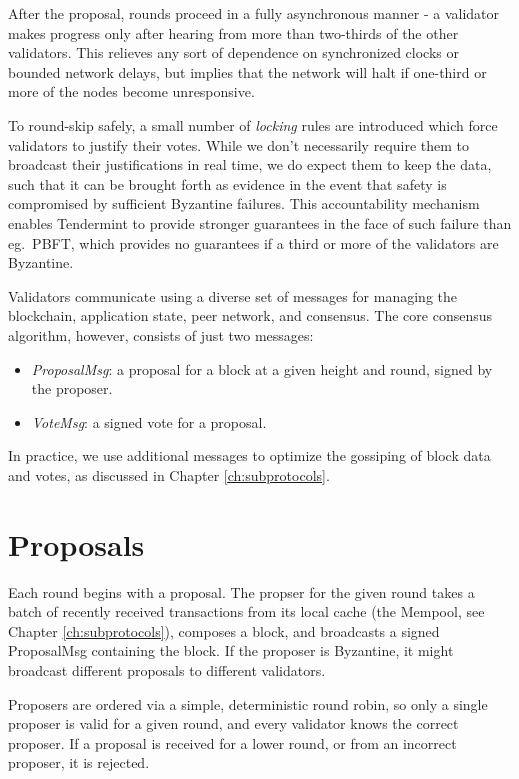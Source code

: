 After the proposal, rounds proceed in a fully asynchronous manner - a validator makes progress only after hearing from more than two-thirds of the other validators.
This relieves any sort of dependence on synchronized clocks or bounded network delays,
but implies that the network will halt if one-third or more of the nodes become unresponsive.

To round-skip safely, a small number of \emph{locking} rules are introduced which force validators to justify their votes.
While we don't necessarily require them to broadcast their justifications in real time, we do expect them to keep the data,
such that it can be brought forth as evidence in the event that safety is compromised by sufficient Byzantine failures.
This accountability mechanism enables Tendermint to provide stronger guarantees in the face of such failure than eg.~PBFT,
which provides no guarantees if a third or more of the validators are Byzantine.

Validators communicate using a diverse set of messages for managing the blockchain, application state, peer network, and consensus.
The core consensus algorithm, however, consists of just two messages:

\begin{itemize}
\item{\emph{ProposalMsg}: a proposal for a block at a given height and round, signed by the proposer.}
\item{\emph{VoteMsg}: a signed vote for a proposal.}
\end{itemize}

In practice, we use additional messages to optimize the gossiping of block data and votes, as discussed in Chapter \ref{ch:subprotocols}.

\section{Proposals}

Each round begins with a proposal. 
The propser for the given round takes a batch of recently received transactions from its local cache (the Mempool, see Chapter \ref{ch:subprotocols}),
composes a block, and broadcasts a signed ProposalMsg containing the block.
If the proposer is Byzantine, it might broadcast different proposals to different validators.

Proposers are ordered via a simple, deterministic round robin, 
so only a single proposer is valid for a given round, 
and every validator knows the correct proposer. 
If a proposal is received for a lower round, or from an incorrect proposer, it is rejected.

